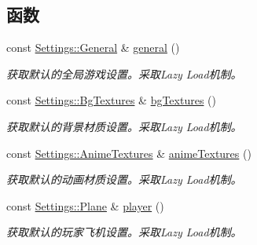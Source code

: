 \subsection*{函数}
\begin{DoxyCompactItemize}
\item 
\mbox{\label{namespace_settings_a8d5eb32bea233e3b9ae9ce6e29b8d8bb}} 
const \hyperlink{struct_settings_1_1_general}{Settings\+::\+General} \& \hyperlink{namespace_settings_a8d5eb32bea233e3b9ae9ce6e29b8d8bb}{general} ()
\begin{DoxyCompactList}\small\item\em 获取默认的全局游戏设置。采取\+Lazy Load机制。 \end{DoxyCompactList}\item 
\mbox{\label{namespace_settings_a8bae923ac0d881b72bbec4f50730ec72}} 
const \hyperlink{struct_settings_1_1_bg_textures}{Settings\+::\+Bg\+Textures} \& \hyperlink{namespace_settings_a8bae923ac0d881b72bbec4f50730ec72}{bg\+Textures} ()
\begin{DoxyCompactList}\small\item\em 获取默认的背景材质设置。采取\+Lazy Load机制。 \end{DoxyCompactList}\item 
\mbox{\label{namespace_settings_ae61a4eddbf5405fae02d781d7e698413}} 
const \hyperlink{struct_settings_1_1_anime_textures}{Settings\+::\+Anime\+Textures} \& \hyperlink{namespace_settings_ae61a4eddbf5405fae02d781d7e698413}{anime\+Textures} ()
\begin{DoxyCompactList}\small\item\em 获取默认的动画材质设置。采取\+Lazy Load机制。 \end{DoxyCompactList}\item 
\mbox{\label{namespace_settings_ab78c6dca0d1b2fc76eae348e81a3eed7}} 
const \hyperlink{struct_settings_1_1_plane}{Settings\+::\+Plane} \& \hyperlink{namespace_settings_ab78c6dca0d1b2fc76eae348e81a3eed7}{player} ()
\begin{DoxyCompactList}\small\item\em 获取默认的玩家飞机设置。采取\+Lazy Load机制。 \end{DoxyCompactList}\item 
\mbox{\label{namespace_settings_a5d571065d327daba740814f8e90261f5}} 

\end{DoxyCompactItemize}

